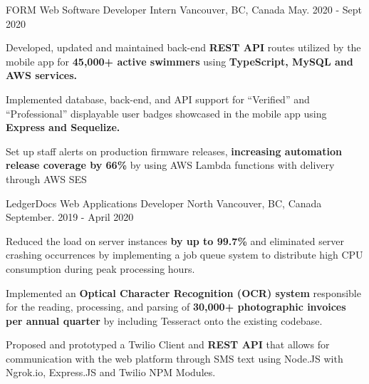\begin{cventries}
{\begin{cvitems}
      \end{cvitems}
    }    
 \cventry
    {FORM} %
    {Web Software Developer Intern} %
    {Vancouver, BC, Canada} %
    {May. 2020 - Sept 2020} %
    {
      \begin{cvitems} %
       \item {Developed, updated and maintained back-end \textbf{REST API} routes utilized by the mobile app for \textbf{45,000+ active swimmers} using \textbf{TypeScript, MySQL and AWS services.}}
       \item {Implemented database, back-end, and API support for ``Verified'' and ``Professional'' displayable user badges showcased in the mobile app using \textbf{ Express and Sequelize.}}
        \item {Set up staff alerts on production firmware releases, \textbf{increasing automation release coverage by 66\%} by using AWS Lambda functions with delivery through AWS SES}
      \end{cvitems}
    }    
\cventry
    {LedgerDocs}  %
    {Web Applications Developer} %
    {North Vancouver, BC, Canada} %
    {September. 2019 - April 2020} %
    {
      \begin{cvitems} %
       \item {Reduced the load on server instances \textbf{by up to 99.7\%} and eliminated server crashing occurrences by implementing a job queue system to distribute high CPU consumption during peak processing hours.}
        \item {Implemented an \textbf{Optical Character Recognition (OCR) system} responsible for the reading, processing, and parsing of \textbf{30,000+ photographic invoices per annual quarter} by including Tesseract onto the existing codebase.}
        \item {Proposed and prototyped a Twilio Client and \textbf{REST API} that allows for communication with the web platform through SMS text using Node.JS with Ngrok.io, Express.JS and Twilio NPM Modules.}
      \end{cvitems}
    }    
  
\end{cventries}
